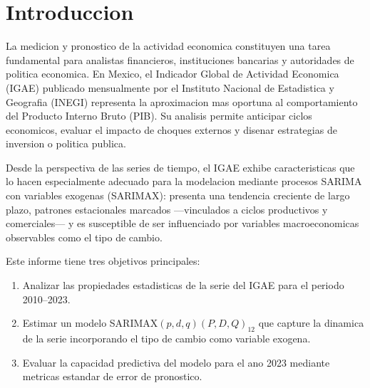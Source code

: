 \documentclass[12pt,a4paper]{article}
\begin{document}
\begin{abstract}
\noindent
El presente informe analiza el Indicador Global de Actividad Economica (IGAE) de Mexico para el periodo enero 2010 -- diciembre 2023, mediante la estimacion de un modelo SARIMAX$(2,1,1)(1,1,1)_{12}$. Se incorpora el tipo de cambio peso-dolar como variable exogena para capturar efectos del sector externo sobre la actividad economica nacional. El modelo es seleccionado a traves de los criterios de informacion AIC y BIC, y su ajuste se evalua mediante pruebas de diagnostico sobre los residuales. Los resultados indican que el modelo captura adecuadamente la dinamica estacional de la serie, incluyendo el choque estructural asociado a la pandemia de COVID-19 en 2020. El pronostico para 2023 presenta un RMSE de 1.58 puntos del indice y un MAPE de 1.14\%, con intervalos de confianza al 95\%.

\medskip
\noindent\textbf{Palabras clave:} SARIMAX, IGAE, actividad economica, series de tiempo, Mexico, pronostico.
\end{abstract}

\tableofcontents
\newpage

\section{Introduccion}

La medicion y pronostico de la actividad economica constituyen una tarea fundamental para analistas financieros, instituciones bancarias y autoridades de politica economica. En Mexico, el Indicador Global de Actividad Economica (IGAE) publicado mensualmente por el Instituto Nacional de Estadistica y Geografia (INEGI) representa la aproximacion mas oportuna al comportamiento del Producto Interno Bruto (PIB). Su analisis permite anticipar ciclos economicos, evaluar el impacto de choques externos y disenar estrategias de inversion o politica publica.

Desde la perspectiva de las series de tiempo, el IGAE exhibe caracteristicas que lo hacen especialmente adecuado para la modelacion mediante procesos SARIMA con variables exogenas (SARIMAX): presenta una tendencia creciente de largo plazo, patrones estacionales marcados ---vinculados a ciclos productivos y comerciales--- y es susceptible de ser influenciado por variables macroeconomicas observables como el tipo de cambio.

Este informe tiene tres objetivos principales:
\begin{enumerate}[label=\roman*.]
  \item Analizar las propiedades estadisticas de la serie del IGAE para el periodo 2010--2023.
  \item Estimar un modelo SARIMAX$(p,d,q)(P,D,Q)_{12}$ que capture la dinamica de la serie incorporando el tipo de cambio como variable exogena.
  \item Evaluar la capacidad predictiva del modelo para el ano 2023 mediante metricas estandar de error de pronostico.
\end{enumerate}
\end{document}
